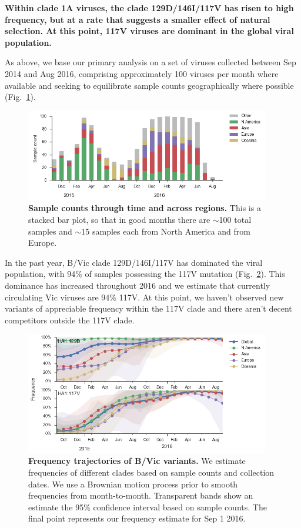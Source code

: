 \documentclass[11pt,oneside,letterpaper]{article}
\begin{document}
\textbf{Within clade 1A viruses, the clade 129D/146I/117V has risen to high frequency, but at a rate that suggests a smaller effect of natural selection. At this point, 117V viruses are dominant in the global viral population.}

As above, we base our primary analysis on a set of viruses collected between Sep 2014 and Aug 2016, comprising approximately 100 viruses per month where available and seeking to equilibrate sample counts geographically where possible (Fig.\ \ref{Vic_counts}).

\begin{figure}[H]
	\centering
	\includegraphics[width=0.95\textwidth]{../figures/sep-2016/Vic_counts.png}
	\caption{\textbf{Sample counts through time and across regions.}
	This is a stacked bar plot, so that in good months there are $\sim$100 total samples and $\sim$15 samples each from North America and from Europe.
	}
	\label{Vic_counts}
\end{figure}

\pagebreak

In the past year, B/Vic clade 129D/146I/117V has dominated the viral population, with 94\% of samples possessing the 117V mutation (Fig.\ \ref{Vic_mutations}). This dominance has increased throughout 2016 and we estimate that currently circulating Vic viruses are 94\% 117V. At this point, we haven't observed new variants of appreciable frequency within the 117V clade and there aren't decent competitors outside the 117V clade.

\begin{figure}[H]
	\centering
	\includegraphics[width=0.95\textwidth]{../figures/sep-2016/Vic_mutations.png}
	\caption{\textbf{Frequency trajectories of B/Vic variants.}
	We estimate frequencies of different clades based on sample counts and collection dates.
	We use a Brownian motion process prior to smooth frequencies from month-to-month.
	Transparent bands show an estimate the 95\% confidence interval based on sample counts.
	The final point represents our frequency estimate for Sep 1 2016.
	}
	\label{Vic_mutations}
\end{figure}
\end{document}
